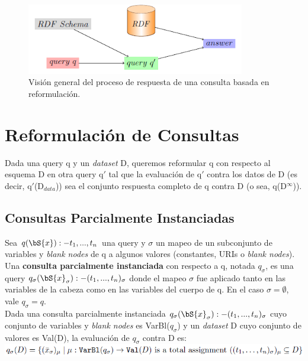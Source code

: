 \documentclass[10pt,a4paper]{article}
\begin{document}
\begin{figure}[H]
\begin{center}
\includegraphics[width=270pt]{imgs/reformulacion}
\caption{Visión general del proceso de respuesta de una consulta basada en reformulación.}
\end{center}
\end{figure}


\section{Reformulación de Consultas}

Dada una query q y un \textit{dataset} D, queremos reformular q con respecto al esquema D en otra query q$'$ tal que la evaluación de q$'$ contra los datos de D (es decir, q$'$(D$_{data}$)) sea el conjunto respuesta completo de q contra D (o sea, q(D$^{\infty}$)).

\subsection{Consultas Parcialmente Instanciadas}

Sea $q(\bS{x}) :- t_{1},...,t_{n}$ una query y $\sigma$ un mapeo de un subconjunto de variables y \textit{blank nodes} de q a algunos valores (constantes, URIs o \textit{blank nodes}).\\

Una \textbf{consulta parcialmente instanciada} con respecto a q, notada $q_{\sigma}$, es una query $q_{\sigma}(\bS{x}_{\sigma}) :- (t_{1},...,t_{n})_{\sigma}$ donde el mapeo $\sigma$ fue aplicado tanto en las variables de la cabeza como en las variables del cuerpo de q. En el caso $\sigma = \emptyset$, vale $q_{\sigma} = q$.\\

Dada una consulta parcialmente instanciada $q_{\sigma}(\bS{x}_{\sigma}) :- (t_{1},...,t_{n})_{\sigma}$ cuyo conjunto de variables y \textit{blank nodes} es VarBl($q_{\sigma}$) y un \textit{dataset} D cuyo conjunto de valores es Val(D), la evaluación de $q_{\sigma}$ contra D es:\\
\includegraphics[scale=0.45]{imgs/01.png}\\
\end{document}
